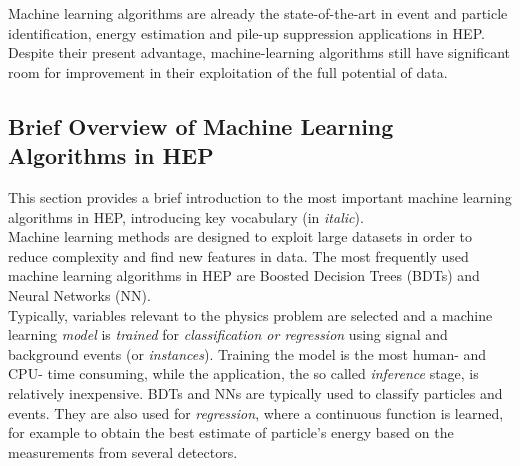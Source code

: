 
Machine learning algorithms are already the state-of-the-art in event and particle identification, energy estimation and pile-up suppression applications in HEP. Despite their present advantage, machine-learning algorithms still have significant room for improvement in their exploitation of the full potential of data.


\subsection{Brief Overview of Machine Learning Algorithms in HEP}

This section provides a brief introduction to the most important machine learning algorithms in HEP, introducing key vocabulary (in \textit{italic}).\\


Machine learning methods are designed to exploit large datasets in order to reduce complexity and find new features in data. The most frequently used machine learning algorithms in HEP are Boosted Decision Trees (BDTs) and Neural Networks (NN).\\

Typically, variables relevant to the physics problem are selected and a machine learning \textit{model} is \textit{trained} for \textit{classification or regression} using signal and background events (or \textit{instances}).
Training the model is the most human- and CPU- time consuming, while the application, the so called \textit{inference} stage, is relatively inexpensive.
BDTs and NNs are typically used to classify particles and events.
They are also used for \textit{regression}, where a continuous function is learned, for example to obtain the best estimate of particle's energy based on the measurements from several detectors.\\

